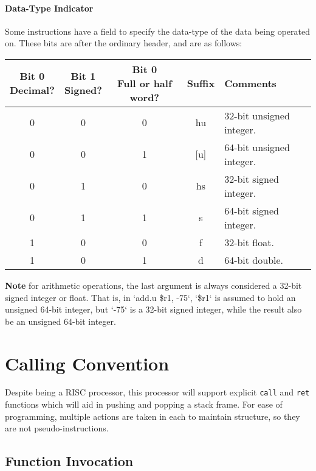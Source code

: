 \documentclass{article}
\begin{document}
\paragraph{Data-Type Indicator}
Some instructions have a field to specify the data-type of the data being operated on.
These bits are after the ordinary header, and are as follows:

\bigskip
\begin{tabular}{|c|c|c||c|l|}
    \hline
    \makecell[c]{\textbf{Bit 0}\\Decimal?} & \makecell[c]{\textbf{Bit 1}\\Signed?} & \makecell[c]{\textbf{Bit 0}\\Full or half word?} & \textbf{Suffix} & \textbf{Comments} \\
    \hline
    0 & 0 & 0 & hu & 32-bit unsigned integer. \\
    \hline
    0 & 0 & 1 & [u] & 64-bit unsigned integer. \\
    \hline
    0 & 1 & 0 & hs & 32-bit signed integer. \\
    \hline
    0 & 1 & 1 & s & 64-bit signed integer. \\
    \hline
    1 & 0 & 0 & f & 32-bit float. \\
    \hline
    1 & 0 & 1 & d & 64-bit double. \\
    \hline
\end{tabular}

\bigskip
\textbf{Note} for arithmetic operations, the last argument is always considered a 32-bit signed integer or float.
That is, in `add.u \$r1, -75`, `\$r1` is assumed to hold an unsigned 64-bit integer, but `-75` is a 32-bit signed integer, while the result also be an unsigned 64-bit integer.

\section{Calling Convention}

Despite being a RISC processor, this processor will support explicit \texttt{call} and \texttt{ret} functions which will aid in pushing and popping a stack frame.
For ease of programming, multiple actions are taken in each to maintain structure, so they are not pseudo-instructions.

\subsection{Function Invocation}
\end{document}

